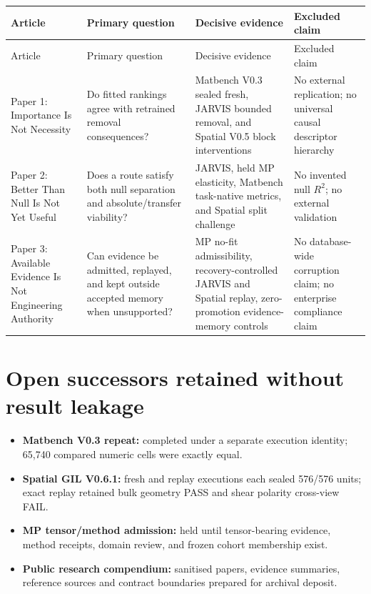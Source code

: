 \documentclass[11pt,a4paper,oneside]{report}
\begin{document}
\begin{longtable}{p{}p{}p{}p{}}
\toprule
Article & Primary question & Decisive evidence & Excluded claim \\
\midrule
\endfirsthead
\toprule
Article & Primary question & Decisive evidence & Excluded claim \\
\midrule
\endhead
Paper 1: Importance Is Not Necessity & Do fitted rankings agree with retrained
removal consequences? & Matbench V0.3 sealed fresh, JARVIS bounded removal, and
Spatial V0.5 block interventions & No external replication; no universal
causal descriptor hierarchy \\
Paper 2: Better Than Null Is Not Yet Useful & Does a route satisfy both null
separation and absolute/transfer viability? & JARVIS, held MP elasticity,
Matbench task-native metrics, and Spatial split challenge & No invented null
$R^2$; no external validation \\
Paper 3: Available Evidence Is Not Engineering Authority & Can evidence be admitted, replayed, and
kept outside accepted memory when unsupported? & MP no-fit admissibility,
recovery-controlled JARVIS and Spatial replay, zero-promotion evidence-memory controls & No
database-wide corruption claim; no enterprise compliance claim \\
\bottomrule
\end{longtable}

\section{Open successors retained without result leakage}

\begin{itemize}
\item \textbf{Matbench V0.3 repeat:} completed under a separate execution identity;
65,740 compared numeric cells were exactly equal.
\item \textbf{Spatial GIL V0.6.1:} fresh and replay executions each sealed 576/576 units; exact replay retained bulk geometry PASS and shear polarity cross-view FAIL.
\item \textbf{MP tensor/method admission:} held until tensor-bearing evidence,
method receipts, domain review, and frozen cohort membership exist.
\item \textbf{Public research compendium:} sanitised papers, evidence summaries,
reference sources and contract boundaries prepared for archival deposit.
\end{itemize}
\end{document}
